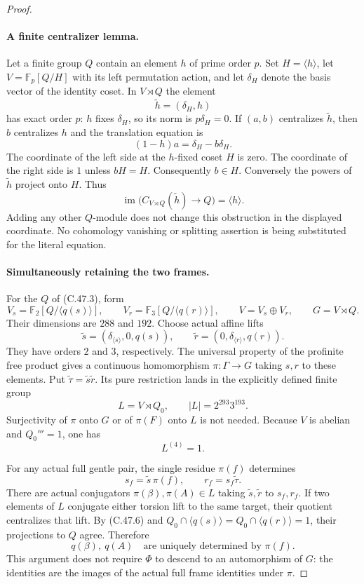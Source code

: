 \begin{proof}
\paragraph{A finite centralizer lemma.}
Let a finite group $Q$ contain an element $h$ of prime order $p$.
Set $H=\langle h\rangle$, let $V=\mathbb F_p[Q/H]$ with its
left permutation action, and let $\delta_H$ denote the basis vector
of the identity coset. In $V\rtimes Q$ the element
\[
                       \widetilde h=(\delta_H,h)
\]
has exact order $p$: $h$ fixes $\delta_H$, so its norm is
$p\delta_H=0$. If $(a,b)$ centralizes $\widetilde h$, then
$b$ centralizes $h$ and the translation equation is
\[
                    (1-h)a=\delta_H-b\delta_H.       \tag{C.47.5}
\]
The coordinate of the left side at the $h$-fixed coset $H$ is zero.
The coordinate of the right side is $1$ unless $bH=H$.
Consequently $b\in H$. Conversely the powers of
$\widetilde h$ project onto $H$. Thus
\[
       \operatorname{im}\bigl(C_{V\rtimes Q}(\widetilde h)\to Q\bigr)
                      =\langle h\rangle.            \tag{C.47.6}
\]
Adding any other $Q$-module does not change this obstruction in
the displayed coordinate. No cohomology vanishing or splitting
assertion is being substituted for the literal equation.

\paragraph{Simultaneously retaining the two frames.}
For the $Q$ of (C.47.3), form
\[
 V_s=\mathbb F_2[Q/\langle q(s)\rangle],\qquad
 V_r=\mathbb F_3[Q/\langle q(r)\rangle],\qquad
 V=V_s\oplus V_r,\qquad G=V\rtimes Q.
\]
Their dimensions are $288$ and $192$. Choose actual affine lifts
\[
 \widetilde s=(\delta_{\langle s\rangle},0,q(s)),\qquad
 \widetilde r=(0,\delta_{\langle r\rangle},q(r)).     \tag{C.47.7}
\]
They have orders $2$ and $3$, respectively. The universal property
of the profinite free product gives a continuous homomorphism
$\pi:\Gamma\to G$ taking $s,r$ to these elements. Put
$\widetilde\tau=\widetilde s\widetilde r$.
Its pure restriction lands in the explicitly defined finite group
\[
                   L=V\rtimes Q_0,
             \qquad |L|=2^{293}3^{193}.              \tag{C.47.8}
\]
Surjectivity of $\pi$ onto $G$ or of $\pi(F)$ onto $L$ is not
needed. Because $V$ is abelian and $Q_0'''=1$, one has
\[
                              L^{(4)}=1.             \tag{C.47.9}
\]

For any actual full gentle pair, the single residue $\pi(f)$
determines
\[
 s_f=\widetilde s\,\pi(f),\qquad
 r_f=s_f\widetilde\tau.                              \tag{C.47.10}
\]
There are actual conjugators $\pi(\beta),\pi(A)\in L$ taking
$\widetilde s,\widetilde r$ to $s_f,r_f$. If two elements of
$L$ conjugate either torsion lift to the same target, their quotient
centralizes that lift. By (C.47.6) and
$Q_0\cap\langle q(s)\rangle=Q_0\cap\langle q(r)\rangle=1$,
their projections to $Q$ agree. Therefore
\[
                       q(\beta),\ q(A)
       \quad\text{are uniquely determined by }\pi(f).           \tag{C.47.11}
\]
This argument does not require $\Phi$ to descend to an automorphism
of $G$: the identities are the images of the actual full frame
identities under $\pi$.


\end{proof}
